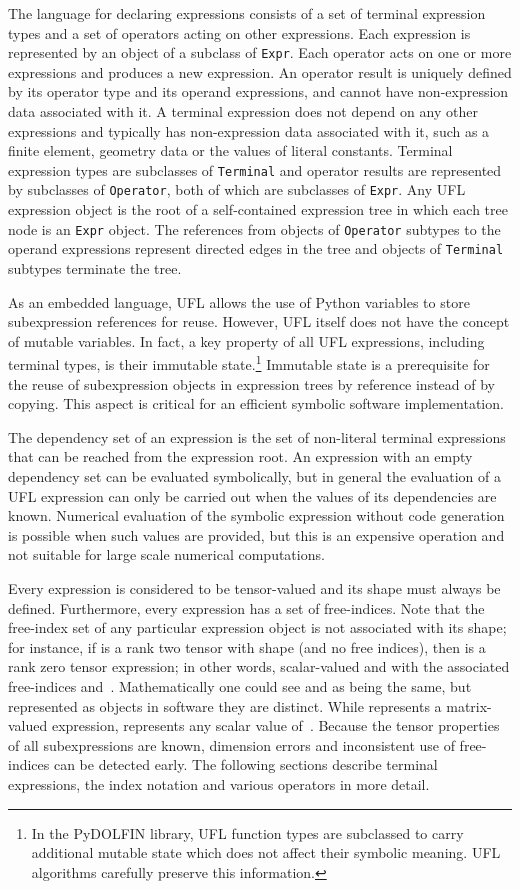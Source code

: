\documentclass[prodmode,acmtoms]{acmsmall}
\newcommand{\uflc}[1]{\texttt{#1}}
\begin{document}
The language for declaring expressions consists of a set of terminal
expression types and a set of operators acting on other expressions.
Each expression is represented by an object of a subclass of \uflc{Expr}.
Each operator acts on one or more expressions and produces a new
expression. An operator result is uniquely defined by its operator
type and its operand expressions, and cannot have non-expression data
associated with it. A terminal expression does not depend on any other
expressions and typically has non-expression data associated with it,
such as a finite element, geometry data or the values of literal
constants. Terminal expression types are subclasses of \uflc{Terminal} and
operator results are represented by subclasses of \uflc{Operator}, both of
which are subclasses of \uflc{Expr}. Any UFL expression object is the root of
a self-contained expression tree in which each tree node is an \uflc{Expr}
object. The references from objects of \uflc{Operator} subtypes to the
operand expressions represent directed edges in the tree and objects
of \uflc{Terminal} subtypes terminate the tree.

As an embedded language, UFL allows the use of Python variables to
store subexpression references for reuse. However, UFL itself does not
have the concept of mutable variables. In fact, a key property of all
UFL expressions, including terminal types, is their immutable
state.\footnote{In the PyDOLFIN library, UFL function types are
  subclassed to carry additional mutable state which does
  not affect their symbolic meaning. UFL algorithms carefully
  preserve this information.}
Immutable state is a prerequisite for
the reuse of subexpression objects in expression trees by reference
instead of by copying. This aspect is critical for an efficient
symbolic software implementation.

The dependency set of an expression is the set of non-literal terminal
expressions that can be reached from the expression root.  An expression
with an empty dependency set can be evaluated symbolically, but in
general the evaluation of a UFL expression can only be carried out when
the values of its dependencies are known. Numerical evaluation of the
symbolic expression without code generation is possible when such values
are provided, but this is an expensive operation and not suitable for
large scale numerical computations.

Every expression is considered to be tensor-valued and its shape
must always be defined. Furthermore, every expression has a set of
free-indices.  Note that the free-index set of any particular expression
object is not associated with its shape; for instance, if  is a rank
two tensor with shape  (and no free indices), then  is
a rank zero tensor expression; in other words, scalar-valued and with
the associated free-indices  and~.  Mathematically one could
see  and  as being the same, but represented as objects
in software they are distinct.  While  represents a matrix-valued
expression,  represents any scalar value of~. Because the
tensor properties of all subexpressions are known, dimension errors and
inconsistent use of free-indices can be detected early. The following
sections describe terminal expressions, the index notation and various
operators in more detail.
\end{document}
